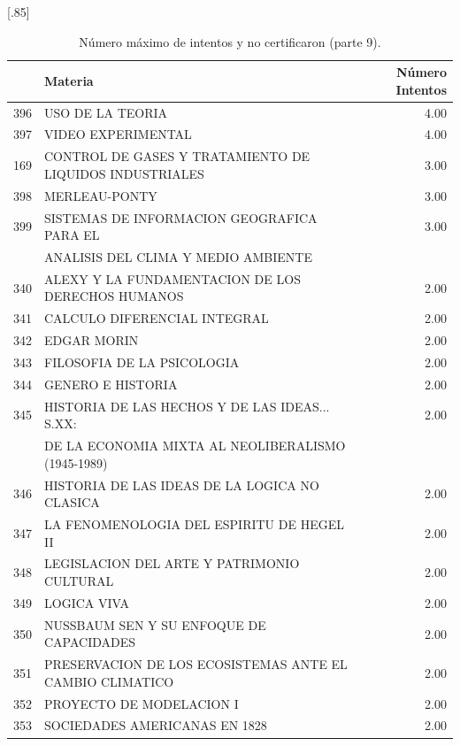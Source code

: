 \documentclass[12pt]{article}
\begin{document}
\begin{table}[ht]
\centering
\scalebox{0.75}[.85]{
\begin{tabular}{rlr}
  \hline
 & Materia & N\'umero Intentos \\ 
  \hline
  396 & USO DE LA TEORIA & 4.00 \\ 
  397 & VIDEO EXPERIMENTAL & 4.00 \\ 
169 & CONTROL DE GASES Y TRATAMIENTO DE LIQUIDOS INDUSTRIALES & 3.00 \\ 
  398 & MERLEAU-PONTY & 3.00 \\ 
  399 & SISTEMAS DE INFORMACION GEOGRAFICA PARA EL & 3.00 \\ 
   & ANALISIS DEL CLIMA Y MEDIO AMBIENTE & \\ 
  340 & ALEXY Y LA FUNDAMENTACION DE LOS DERECHOS HUMANOS & 2.00 \\ 
  341 & CALCULO DIFERENCIAL INTEGRAL & 2.00 \\ 
  342 & EDGAR MORIN & 2.00 \\ 
  343 & FILOSOFIA DE LA PSICOLOGIA & 2.00 \\ 
  344 & GENERO E HISTORIA & 2.00 \\ 
  345 & HISTORIA DE LAS HECHOS Y DE LAS IDEAS... S.XX: & 2.00 \\ 
   & DE LA ECONOMIA MIXTA AL NEOLIBERALISMO (1945-1989) &  \\ 
  346 & HISTORIA DE LAS IDEAS DE LA LOGICA NO CLASICA & 2.00 \\ 
  347 & LA FENOMENOLOGIA DEL ESPIRITU DE HEGEL II & 2.00 \\ 
  348 & LEGISLACION DEL ARTE Y PATRIMONIO CULTURAL & 2.00 \\ 
  349 & LOGICA VIVA & 2.00 \\ 
  350 & NUSSBAUM SEN Y SU ENFOQUE DE CAPACIDADES & 2.00 \\ 
  351 & PRESERVACION DE LOS ECOSISTEMAS ANTE EL CAMBIO CLIMATICO & 2.00 \\ 
  352 & PROYECTO DE MODELACION I & 2.00 \\ 
  353 & SOCIEDADES AMERICANAS EN 1828 & 2.00 \\ 
   \hline
\end{tabular}}
\caption{\label{Num_Max_Intentos_Nunca_Cert_9} N\'umero m\'aximo de intentos y no certificaron (parte 9).}
\end{table}
\end{document}
